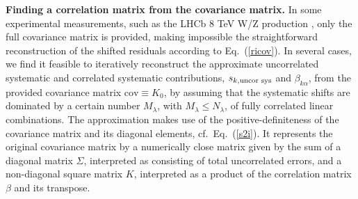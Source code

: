 {\bf Finding a correlation matrix from the covariance matrix.} In some experimental measurements, such as the LHCb 8 TeV W/Z production \cite{Aaij:2015zlq},
only the full covariance matrix is provided, making impossible the straightforward
reconstruction of the shifted residuals according to Eq.~(\ref{ricov}).
In several cases, we find it feasible to iteratively reconstruct the
approximate uncorrelated systematic and correlated systematic contributions,
$s_{k,\mbox{\scriptsize uncor sys}}$ and $\beta_{k\alpha}$, from the
provided covariance matrix $\mbox{cov}\equiv K_{0}$, by assuming
that the systematic shifts are dominated by a certain number $M_{\lambda}$,
with $M_{\lambda}\leq N_{\lambda}$, of fully correlated linear combinations.
The approximation makes use of the positive-definiteness of the covariance
matrix and its diagonal elements, cf.~Eq.~(\ref{s2i}). It represents
the original covariance matrix by a numerically close matrix
given by the sum of a diagonal matrix $\Sigma$, interpreted as consisting of total uncorrelated errors, and a non-diagonal square matrix $K$, interpreted as a product of the correlation matrix $\beta$ and its transpose.

